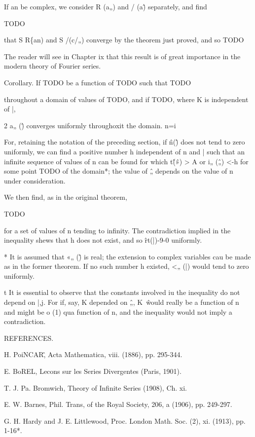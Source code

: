 If an be complex, we consider R (a„) and / (a\^) separately, and find

TODO

that S R\{an) and S /(c/„) converge by the theorem just proved, and so
TODO

The reader will see in Chapter ix that this result is of great
importance in the modern theory of Fourier series.

Corollary. If TODO be a function of TODO such that TODO

throughout a domain of values of TODO, and if TODO, where K is
independent of |,

2 a„ (\^) converges uniformly throughoxit the domain. n=i

For, retaining the notation of the preceding section, if \^n(\^) does
not tend to zero uniformly, we can find a positive number h
independent of n and | such that an infinite sequence of values of n
can be found for which t\^ (\^») > A or i„ (\^„) <-h for some point
TODO of the domain*; the value of \^„ depends on the value of n under
consideration.

We then find, as in the original theorem,

TODO

for a set of values of n tending to infinity. The contradiction
implied in the inequality shews that h does not exist, and so
\^rt(|)-9-0 uniformly.

* It is assumed that «„ (\^) is real; the extension to complex
variables cau be made as in the former theorem. If no such number h
existed, <„ (|) would tend to zero uniformly.

t It is essential to observe that the constants involved iu the
inequality do not depend on |,j. For if, say, K depended on \^„, K~\^
would really be a function of n and might be o (1) qua function of n,
and the inequality would not imply a contradiction.

%
%

REFERENCES.

H. PoiNCAR\^, Acta Mathematica, viii. (1886), pp. 295-344.

E. BoREL, Lecons sur les Series Divergentes (Paris, 1901).

T. J. Pa. Bromwich, Theory of Infinite Series (1908), Ch. xi.

E. W. Barnes, Phil. Trans, of the Royal Society, 206, a (1906), pp.
249-297.

G. H. Hardy and J. E. Littlewood, Proc. London Math. Soc. (2), xi.
(1913), pp. 1-16*.

